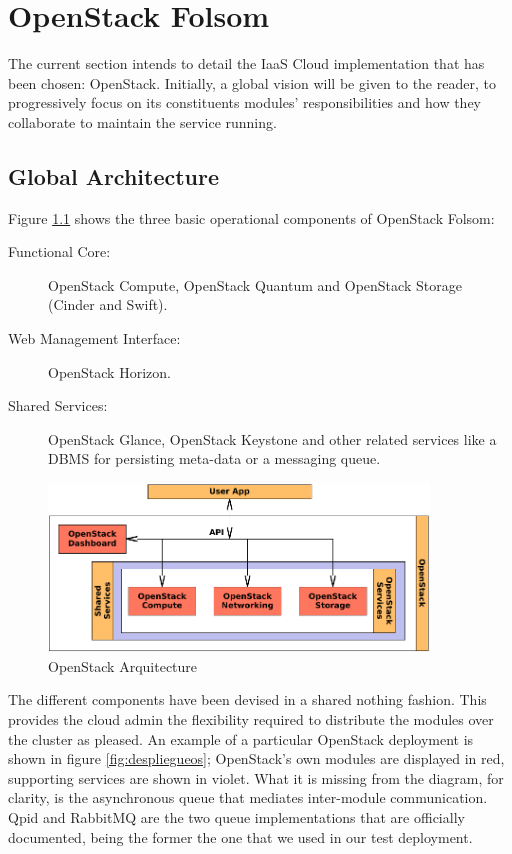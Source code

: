 \chapter{OpenStack Folsom}\label{cap:openstack}

\noindent The current section intends to detail the IaaS Cloud implementation that has been chosen: OpenStack. Initially, a global vision will be given to the reader, to progressively focus on its constituents modules' responsibilities and how they collaborate to maintain the service running.

\section{Global Architecture}\label{sec:arquitecturaglobal}

\noindent Figure \ref{fig:arquitecturaos} shows the three basic operational components of OpenStack Folsom:

\begin{description}
 \item[Functional Core:] OpenStack Compute, OpenStack Quantum and OpenStack Storage (Cinder and Swift).
 \item[Web Management Interface:] OpenStack Horizon.
 \item[Shared Services:] OpenStack Glance, OpenStack Keystone and other related services like a DBMS for persisting meta-data or a messaging queue.
\end{description}

\begin{figure}[tbp]
\begin{center}
\includegraphics[width=0.9\textwidth]{imagenes/012.pdf}
 \caption{OpenStack Arquitecture}
\label{fig:arquitecturaos}
\end{center}
\end{figure}

The different components have been devised in a shared nothing fashion. This provides the cloud admin the flexibility required to distribute the modules over the cluster as pleased. An example of a particular OpenStack deployment is shown in figure \ref{fig:despliegueos}; OpenStack's own modules are displayed in red, supporting services are shown in violet. What it is missing from the diagram, for clarity, is the asynchronous queue that mediates inter-module communication. Qpid and RabbitMQ are the two queue implementations that are officially documented, being the former the one that we used in our test deployment.

